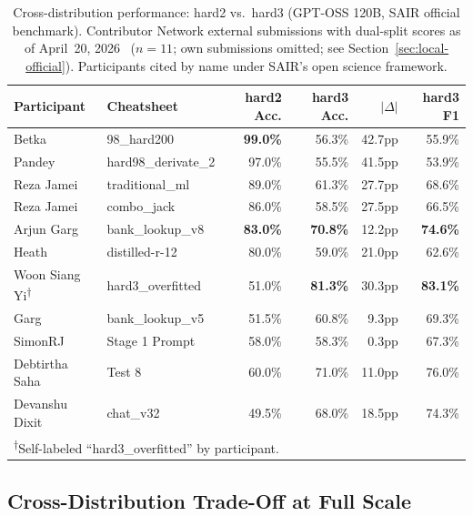 \documentclass[11pt]{article}
\begin{document}
\begin{table}[h]
\centering
\caption{Cross-distribution performance: hard2 vs.\ hard3
(GPT-OSS 120B, SAIR official benchmark). Contributor Network
external submissions with dual-split scores as of
April~20, 2026~\citep{sair2026leaderboard} ($n{=}11$; own
submissions omitted; see Section~\ref{sec:local-official}).
Participants cited by name under SAIR's open science framework.}
\label{tab:crossdist}
\small
\begin{tabular}{llrrrr}
\toprule
Participant & Cheatsheet & hard2 Acc. & hard3 Acc. & $|\Delta|$ & hard3 F1 \\
\midrule
Betka       & 98\_hard200           & \textbf{99.0\%} & 56.3\% & 42.7pp & 55.9\% \\
Pandey      & hard98\_derivate\_2   & 97.0\%          & 55.5\% & 41.5pp & 53.9\% \\
Reza Jamei  & traditional\_ml       & 89.0\%          & 61.3\% & 27.7pp & 68.6\% \\
Reza Jamei  & combo\_jack           & 86.0\%          & 58.5\% & 27.5pp & 66.5\% \\
Arjun Garg  & bank\_lookup\_v8      & \textbf{83.0\%} & \textbf{70.8\%} & 12.2pp & \textbf{74.6\%} \\
Heath       & distilled-r-12        & 80.0\%          & 59.0\% & 21.0pp & 62.6\% \\
Woon Siang Yi\textsuperscript{$\dagger$} & hard3\_overfitted & 51.0\% & \textbf{81.3\%} & 30.3pp & \textbf{83.1\%} \\
Garg        & bank\_lookup\_v5      & 51.5\%          & 60.8\% & 9.3pp  & 69.3\% \\
SimonRJ     & Stage 1 Prompt        & 58.0\%          & 58.3\% & 0.3pp  & 67.3\% \\
Debtirtha Saha & Test 8             & 60.0\%          & 71.0\% & 11.0pp & 76.0\% \\
Devanshu Dixit & chat\_v32          & 49.5\%          & 68.0\% & 18.5pp & 74.3\% \\
\bottomrule
\multicolumn{6}{l}{\textsuperscript{$\dagger$}Self-labeled ``hard3\_overfitted'' by participant.}
\end{tabular}
\end{table}

\subsection{Cross-Distribution Trade-Off at Full Scale}
\label{sec:official-tradeoff}
\end{document}
